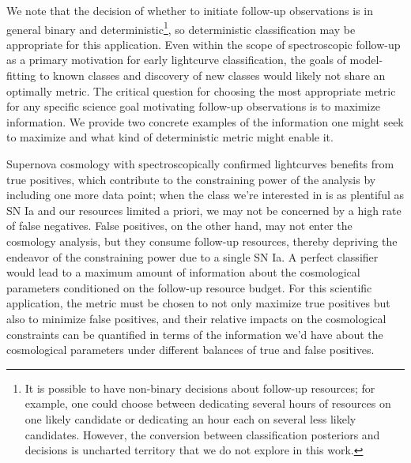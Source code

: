 We note that the decision of whether to initiate follow-up observations is in general binary and deterministic\footnote{It is possible to have non-binary decisions about follow-up resources; for example, one could choose between dedicating several hours of resources on one likely candidate or dedicating an hour each on several less likely candidates.  However, the conversion between classification posteriors and decisions is uncharted territory that we do not explore in this work.}, so deterministic classification may be appropriate for this application.
Even within the scope of spectroscopic follow-up as a primary motivation for early lightcurve classification, the goals of model-fitting to known classes and discovery of new classes would likely not share an optimally metric.
The critical question for choosing the most appropriate metric for any specific science goal motivating follow-up observations is to maximize information.
We provide two concrete examples of the information one might seek to maximize and what kind of deterministic metric might enable it.

Supernova cosmology with spectroscopically confirmed lightcurves benefits from true positives, which contribute to the constraining power of the analysis by including one more data point; when the class we're interested in is as plentiful as SN Ia and our resources limited a priori, we may not be concerned by a high rate of false negatives.
False positives, on the other hand, may not enter the cosmology analysis, but they consume follow-up resources, thereby depriving the endeavor of the constraining power due to a single SN Ia.
A perfect classifier would lead to a maximum amount of information about the cosmological parameters conditioned on the follow-up resource budget.
For this scientific application, the metric must be chosen to not only maximize true positives but also to minimize false positives, and their relative impacts on the cosmological constraints can be quantified in terms of the information we'd have about the cosmological parameters under different balances of true and false positives.

